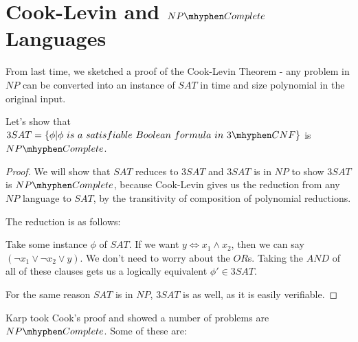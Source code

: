 



\section*{Cook-Levin and $NP\mhyphen Complete$ Languages}

From last time, we sketched a proof of the Cook-Levin Theorem - any problem in $NP$ can be converted into an instance of $SAT$ in time and size polynomial in the original input.

Let's show that $3SAT = \{ \phi | \phi \ is  \ a \ satisfiable \  Boolean \ formula \ in \ 3\mhyphen CNF\}$ is $NP\mhyphen Complete$.

\begin{proof}
	We will show that $SAT$ reduces to $3SAT$ and $3SAT$ is in $NP$ to show $3SAT$ is $NP\mhyphen Complete$, because Cook-Levin gives us the reduction from any $NP$ language to $SAT$, by the transitivity of composition of polynomial reductions.
	
	The reduction is as follows:
	
	Take some instance $\phi$ of $SAT$.  If we want $y \Leftrightarrow x_1\land x_2$, then we can say $(\lnot x_1 \lor \lnot x_2 \lor y)$.  We don't need to worry about the $OR$s.  Taking the $AND$ of all of these clauses gets us a logically equivalent $\phi'\in 3SAT$.
	
	For the same reason $SAT$ is in $NP$, $3SAT$ is as well, as it is easily verifiable.
	
	
	
\end{proof}

Karp took Cook's proof and showed a number of problems are $NP\mhyphen Complete$.  Some of these are:

